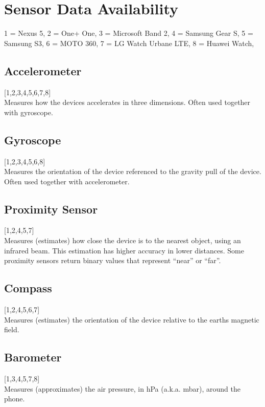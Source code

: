 
\section{Sensor Data Availability}
\label{sec:sensor_data_availability}

1 = Nexus 5,
2 = One+ One,
3 = Microsoft Band 2,
4 = Samsung Gear S,
5 = Samsung S3,
6 = MOTO 360,
7 = LG Watch Urbane LTE,
8 = Huawei Watch,


\subsection{Accelerometer}
\label{sub:accelerometer}
[1,2,3,4,5,6,7,8] \\
Measures how the devices accelerates in three dimensions. Often used together with gyroscope.

\subsection{Gyroscope}
\label{sub:gyroscope}
[1,2,3,4,5,6,8] \\
Measures the orientation of the device referenced to the gravity pull of the device. Often used together with accelerometer.

\subsection{Proximity Sensor}
\label{sub:proximity_sensor}
[1,2,4,5,7] \\
Measures (estimates) how close the device is to the nearest object, using an infrared beam. This estimation has higher accuracy in lower distances. Some proximity sensors return binary values that represent ``near'' or ``far''.

\subsection{Compass}
\label{sub:compass}
[1,2,4,5,6,7] \\
Measures (estimates) the orientation of the device relative to the earths magnetic field.

\subsection{Barometer}
\label{sub:barometer}
[1,3,4,5,7,8] \\
Measures (approximates) the air pressure, in hPa (a.k.a. mbar), around the phone.

